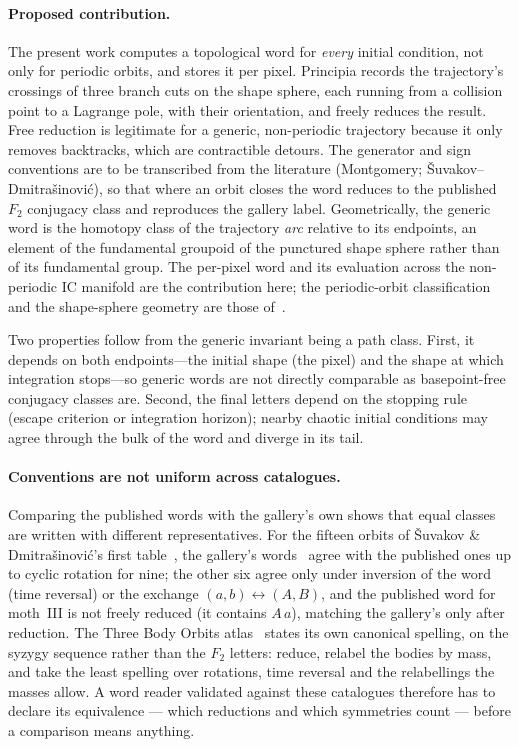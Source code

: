 \documentclass[11pt,a4paper]{article}
\begin{document}
\paragraph{Proposed contribution.}
The present work computes a topological word for \emph{every} initial condition, not only for
periodic orbits, and stores it per pixel.  Principia records the trajectory's crossings of three
branch cuts on the shape sphere, each running from a collision point to a Lagrange pole, with
their orientation, and freely reduces the result.  Free reduction is legitimate for a generic,
non-periodic trajectory because it only removes backtracks, which are contractible detours.  The
generator and sign conventions are to be transcribed from the literature
(Montgomery; \v{S}uvakov--Dmitra\v{s}inovi\'{c}), so that where an orbit closes the word reduces
to the published $F_2$ conjugacy class and reproduces the gallery label.  Geometrically, the
generic word is the homotopy class of the trajectory \emph{arc} relative to its endpoints, an
element of the fundamental groupoid of the punctured shape sphere rather than of its fundamental
group.  The per-pixel word and its evaluation across the non-periodic IC manifold are the
contribution here; the periodic-orbit classification and the shape-sphere geometry are those
of~\cite{tanikawa2015,tanikawa2000,montgomery2015,montgomery1998,suvakov2013,suvakov2014}.

Two properties follow from the generic invariant being a path class.  First, it depends on both
endpoints---the initial shape (the pixel) and the shape at which integration stops---so generic
words are not directly comparable as basepoint-free conjugacy classes are.  Second, the final
letters depend on the stopping rule (escape criterion or integration horizon); nearby chaotic
initial conditions may agree through the bulk of the word and diverge in its tail.

\paragraph{Conventions are not uniform across catalogues.}
Comparing the published words with the gallery's own shows that equal classes are written with
different representatives.  For the fifteen orbits of \v{S}uvakov \&
Dmitra\v{s}inovi\'{c}'s first table~\cite{suvakov2013}, the gallery's words~\cite{threebodygallery}
agree with the published ones up to cyclic rotation for nine; the other six agree only under
inversion of the word (time reversal) or the exchange $(a,b)\leftrightarrow(A,B)$, and the
published word for moth~III is not freely reduced (it contains $A\,a$), matching the gallery's
only after reduction.  The Three Body Orbits atlas~\cite{tbo2026} states its own canonical
spelling, on the syzygy sequence rather than the $F_2$ letters: reduce, relabel the bodies by mass,
and take the least spelling over rotations, time reversal and the relabellings the masses allow.
A word reader validated against these catalogues therefore has to declare its equivalence ---
which reductions and which symmetries count --- before a comparison means anything.
\end{document}
